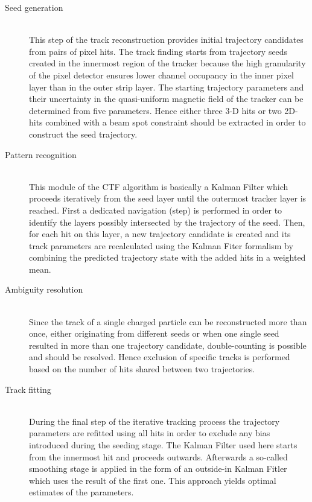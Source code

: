 \begin{myindentpar}
  \begin{description}
    \item[Seed generation] \hfill \\
    This step of the track reconstruction provides initial trajectory candidates from pairs of pixel hits. The track finding starts from trajectory seeds created in the innermost region of the tracker because the high granularity of the pixel detector ensures lower channel occupancy in the inner pixel layer than in the outer strip layer. 
    The starting trajectory parameters and their uncertainty in the quasi-uniform magnetic field of the tracker can be determined from five parameters. Hence either three 3-D hits or two 2D-hits combined with a beam spot constraint should be extracted in order to construct the seed trajectory.
    \item[Pattern recognition] \hfill \\
    This module of the CTF algorithm is basically a Kalman Filter which proceeds iteratively from the seed layer until the outermost tracker layer is reached. %
    First a dedicated navigation (step) is performed in order to identify the layers possibly intersected by the trajectory of the seed. Then, for each hit on this layer, a new trajectory candidate is created and its track parameters are recalculated using the Kalman Fiter formalism by combining the predicted trajectory state with the added hits in a weighted mean.
    \item[Ambiguity resolution] \hfill \\
    Since the track of a single charged particle can be reconstructed more than once, either originating from different seeds or when one single seed resulted in more than one trajectory candidate, double-counting is possible and should be resolved. Hence exclusion of specific tracks is performed based on the number of hits shared between two trajectories. 
    \item[Track fitting] \hfill \\
    During the final step of the iterative tracking process the trajectory parameters are refitted using all hits in order to exclude any bias introduced during the seeding stage. The Kalman Filter used here starts from the innermost hit and proceeds outwards. Afterwards a so-called smoothing stage is applied in the form of an outside-in Kalman Fitler which uses the result of the first one. This approach yields optimal estimates of the parameters.
  \end{description}
\end{myindentpar}

